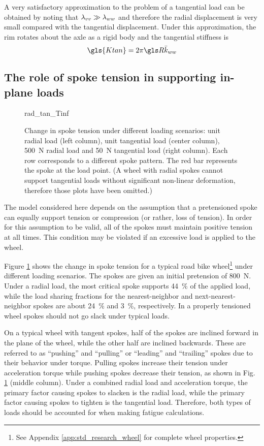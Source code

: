 \documentclass[\rootdir/thesis.tex]{subfiles}
\begin{document}
A very satisfactory approximation to the problem of a tangential load can be obtained by noting that $\lambda_{vv}\gg\lambda_{ww}$ and therefore the radial displacement is very small compared with the tangential displacement. Under this approximation, the rim rotates about the axle as a rigid body and the tangential stiffness is
\begin{equation}
\label{eq:Ktan}
\gls{Ktan} = 2\pi\R \kww
\end{equation}

\subsection{The role of spoke tension in supporting in-plane loads}

\begin{figure}
\centering
{rad_tan_Tinf}
\caption[Change in spokes tensions under in-plane loads]{Change in spoke tension under different loading scenarios: unit radial load (left column), unit tangential load (center column), \SI{500}{N} radial load and \SI{50}{N} tangential load (right column). Each row corresponds to a different spoke pattern. The red bar represents the spoke at the load point. (A wheel with radial spokes cannot support tangential loads without significant non-linear deformation, therefore those plots have been omitted.)}
\label{fig:radtan_Tinf}
\end{figure}

The model considered here depends on the assumption that a pretensioned spoke can equally support tension or compression (or rather, loss of tension). In order for this assumption to be valid, all of the spokes must maintain positive tension at all times. This condition may be violated if an excessive load is applied to the wheel.

Figure \ref{fig:radtan_Tinf} shows the change in spoke tension for a typical road bike wheel\footnote{See Appendix \ref{app:std_research_wheel} for complete wheel properties.} under different loading scenarios. The spokes are given an initial pretension of \SI{800}{N}. Under a radial load, the most critical spoke supports \SI{44}{\percent} of the applied load, while the load sharing fractions for the nearest-neighbor and next-nearest-neighbor spokes are about \SI{24}{\percent} and \SI{3}{\percent}, respectively. In a properly tensioned wheel spokes should not go slack under typical loads.

On a typical wheel with tangent spokes, half of the spokes are inclined forward in the plane of the wheel, while the other half are inclined backwards. These are referred to as ``pushing'' and ``pulling'' or ``leading'' and ``trailing'' spokes due to their behavior under torque. Pulling spokes increase their tension under acceleration torque while pushing spokes decrease their tension, as shown in Fig. \ref{fig:radtan_Tinf} (middle column). Under a combined radial load and acceleration torque, the primary factor causing spokes to slacken is the radial load, while the primary factor causing spokes to tighten is the tangential load. Therefore, both types of loads should be accounted for when making fatigue calculations.
\end{document}
